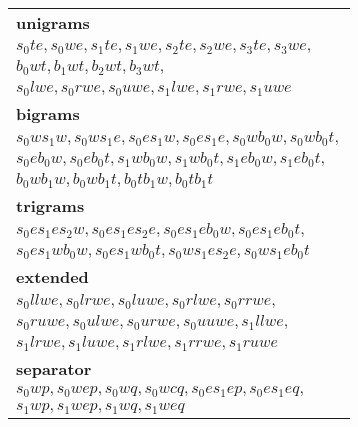 \documentclass[11pt]{article}
\begin{document}
\begin{figure*}
\captionsetup[subfigure]{justification=centering}
\begin{adjustbox}{width=\textwidth}
\small
\begin{minipage}[c][11cm][t]{.5\textwidth}
\vspace*{\fill}
\begin{tabular}{l}
\textbf{unigrams} \\
$s_0te, s_0we, s_1te, s_1we, s_2te, s_2we, s_3te, s_3we,$ \\
$b_0wt, b_1wt, b_2wt, b_3wt,$ \\
$s_0lwe, s_0rwe, s_0uwe, s_1lwe, s_1rwe, s_1uwe$ \\
\textbf{bigrams} \\
$s_0ws_1w, s_0ws_1e, s_0es_1w, s_0es_1e, s_0wb_0w, s_0wb_0t,$ \\
$s_0eb_0w, s_0eb_0t, s_1wb_0w, s_1wb_0t, s_1eb_0w, s_1eb_0t,$ \\
$b_0wb_1w, b_0wb_1t, b_0tb_1w, b_0tb_1t$ \\
\textbf{trigrams} \\
$s_0es_1es_2w, s_0es_1es_2e, s_0es_1eb_0w, s_0es_1eb_0t,$ \\
$s_0es_1wb_0w, s_0es_1wb_0t, s_0ws_1es_2e, s_0ws_1eb_0t$ \\
\textbf{extended} \\
$s_0llwe, s_0lrwe, s_0luwe, s_0rlwe, s_0rrwe,$ \\
$s_0ruwe, s_0ulwe, s_0urwe, s_0uuwe, s_1llwe,$ \\
$s_1lrwe, s_1luwe, s_1rlwe, s_1rrwe, s_1ruwe$ \\
\textbf{separator} \\
$s_0wp, s_0wep, s_0wq, s_0wcq, s_0es_1ep, s_0es_1eq,$ \\
$s_1wp, s_1wep, s_1wq, s_1weq$
\end{tabular}
\end{minipage}


\end{adjustbox}
\end{figure*}
\end{document}
